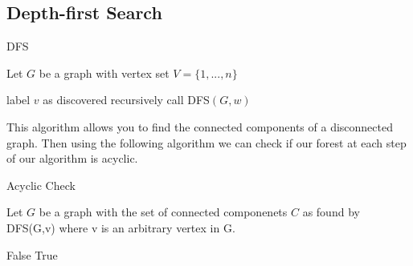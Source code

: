 \documentclass[../main.tex]{subfiles}
\begin{document}
\subsection{Depth-first Search}
\begin{algorithm}[H]
\caption{DFS}\label{dfs}
Let $G$ be a graph with vertex set $V = \{1,...,n\}$
\begin{algorithmic}[1]
\State label $v$ as discovered
	 	\State recursively call DFS$(G,w)$
	\EndIf
\EndFor
\EndProcedure
\end{algorithmic}
\end{algorithm}

\noindent This algorithm allows you to find the connected components of a disconnected graph. Then using the following algorithm we can check if our forest at each step of our algorithm is acyclic.

\begin{algorithm}[H]
\caption{Acyclic Check}\label{acyclic}
Let $G$ be a graph with the set of connected componenets $C$ as found by DFS(G,v) where v is an arbitrary vertex in G.
\begin{algorithmic}[1]
		\Return False
	\EndIf
\EndFor
	\Return True
\EndProcedure
\end{algorithmic}
\end{algorithm}
\end{document}
